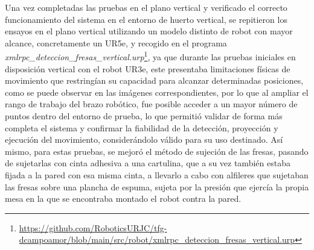 Una vez completadas las pruebas en el plano vertical y verificado el correcto funcionamiento del sistema en el entorno de huerto vertical, se repitieron los ensayos en el plano vertical utilizando un modelo distinto de robot con mayor alcance, concretamente un UR5e, y recogido en el programa \textit{xmlrpc\_deteccion\_fresas\_vertical.urp}\footnote{\url{https://github.com/RoboticsURJC/tfg-dcampoamor/blob/main/src/robot/xmlrpc\_deteccion\_fresas\_vertical.urp}}, ya que durante las pruebas iniciales en disposición vertical con el robot UR3e, este presentaba limitaciones físicas de movimiento que restringían su capacidad para alcanzar determinadas posiciones, como se puede observar en las imágenes correspondientes, por lo que al ampliar el rango de trabajo del brazo robótico, fue posible acceder a un mayor número de puntos dentro del entorno de prueba, lo que permitió validar de forma más completa el sistema y confirmar la fiabilidad de la detección, proyección y ejecución del movimiento, considerándolo válido para su uso destinado. Así mismo, para estas pruebas, se mejoró el método de sujeción de las fresas, pasando de sujetarlas con cinta adhesiva a una cartulina, que a su vez también estaba fijada a la pared con esa misma cinta, a llevarlo a cabo con alfileres que sujetaban las fresas sobre una plancha de espuma, sujeta por la presión que ejercía la propia mesa en la que se encontraba montado el robot contra la pared.



